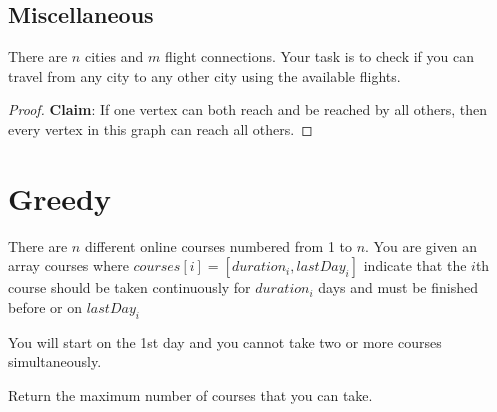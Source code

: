 \documentclass[11pt]{article}
\begin{document}
\subsection{Miscellaneous}
\label{sec:orgb346e2f}
\begin{problem}
There are \(n\) cities and \(m\) flight connections. Your task is to check if you can travel from any
city to any other city using the available flights.
\end{problem}

\begin{proof}
\textbf{Claim}: If one vertex can both reach and be reached by all others,
then every vertex in this graph can reach all others.
\end{proof}

\section{Greedy}
\label{sec:org70c86ea}
\begin{problem}
There are \(n\) different online courses numbered from 1 to \(n\). You are given an array courses where
\(courses[i]=[duration_i,lastDay_i]\) indicate that the \(i\)th course should be taken continuously for
\(duration_i\) days and must be finished before or on \(lastDay_i\)

You will start on the 1st day and you cannot take two or more courses simultaneously.

Return the maximum number of courses that you can take.
\end{problem}
\end{document}
